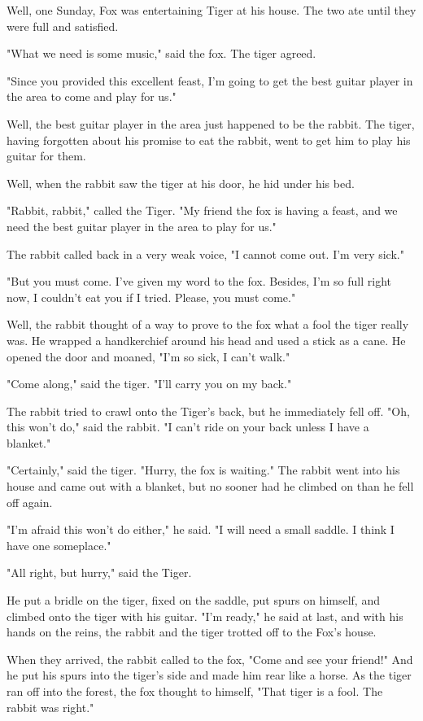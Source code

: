Well, one Sunday, Fox was entertaining Tiger at his house. The two ate until they were full and satisfied.

"What we need is some music," said the fox. The tiger agreed.

"Since you provided this excellent feast, I'm going to get the best guitar player in the area to come and play for us."

Well, the best guitar player in the area just happened to be the rabbit. The tiger, having forgotten about his promise to eat the rabbit, went to get him to play his guitar for them.

Well, when the rabbit saw the tiger at his door, he hid under his bed.

"Rabbit, rabbit," called the Tiger. "My friend the fox is having a feast, and we need the best guitar player in the area to play for us."

The rabbit called back in a very weak voice, "I cannot come out. I'm very sick."

"But you must come. I've given my word to the fox. Besides, I'm so full right now, I couldn't eat you if I tried. Please, you must come."

Well, the rabbit thought of a way to prove to the fox what a fool the tiger really was. He wrapped a handkerchief around his head and used a stick as a cane. He opened the door and moaned, "I'm so sick, I can't walk."

"Come along," said the tiger. "I'll carry you on my back."

The rabbit tried to crawl onto the Tiger's back, but he immediately fell off. "Oh, this won't do," said the rabbit. "I can't ride on your back unless I have a blanket."

"Certainly," said the tiger. "Hurry, the fox is waiting." The rabbit went into his house and came out with a blanket, but no sooner had he climbed on than he fell off again.

"I'm afraid this won't do either," he said. "I will need a small saddle. I think I have one someplace."

"All right, but hurry," said the Tiger.

He put a bridle on the tiger, fixed on the saddle, put spurs on himself, and climbed onto the tiger with his guitar. "I'm ready," he said at last, and with his hands on the reins, the rabbit and the tiger trotted off to the Fox's house.

When they arrived, the rabbit called to the fox, "Come and see your friend!" And he put his spurs into the tiger's side and made him rear like a horse. As the tiger ran off into the forest, the fox thought to himself, "That tiger is a fool. The rabbit was right."

